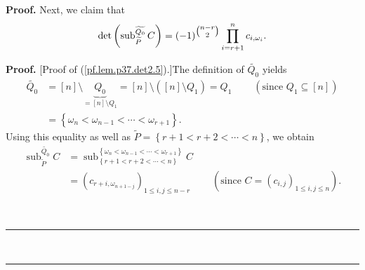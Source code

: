 \documentclass[numbers=enddot,12pt,final,onecolumn,notitlepage]{scrartcl}%
\theoremstyle{definition}
\newenvironment{proof}[1][Proof]{\noindent\textbf{#1.} }{\ \rule{0.5em}{0.5em}}
\let\prodnonlimits\prod
\renewcommand{\prod}{\prodnonlimits\limits}
\begin{document}
\begin{enumerate}
\begin{proof}
Next, we claim that%
\begin{equation}
\det\left(  \operatorname*{sub}\nolimits_{\widetilde{P}}^{\widetilde{Q_{0}}%
}C\right)  =\left(  -1\right)  ^{\tbinom{n-r}{2}}\prod_{i=r+1}^{n}%
c_{i,\omega_{i}}. \label{pf.lem.p37.det2.5}%
\end{equation}


\begin{proof}
[Proof of (\ref{pf.lem.p37.det2.5}).]The definition of $\widetilde{Q_{0}}$
yields%
\begin{align*}
\widetilde{Q_{0}}  &  =\left[  n\right]  \setminus\underbrace{Q_{0}}_{=\left[
n\right]  \setminus Q_{1}}=\left[  n\right]  \setminus\left(  \left[
n\right]  \setminus Q_{1}\right)  =Q_{1}\ \ \ \ \ \ \ \ \ \ \left(
\text{since }Q_{1}\subseteq\left[  n\right]  \right) \\
&  =\left\{  \omega_{n}<\omega_{n-1}<\cdots<\omega_{r+1}\right\}  .
\end{align*}
Using this equality as well as $\widetilde{P}=\left\{  r+1<r+2<\cdots
<n\right\}  $, we obtain%
\begin{align}
\operatorname*{sub}\nolimits_{\widetilde{P}}^{\widetilde{Q_{0}}}C  &
=\operatorname*{sub}\nolimits_{\left\{  r+1<r+2<\cdots<n\right\}  }^{\left\{
\omega_{n}<\omega_{n-1}<\cdots<\omega_{r+1}\right\}  }C\nonumber\\
&  =\left(  c_{r+i,\omega_{n+1-j}}\right)  _{1\leq i,j\leq n-r}%
\ \ \ \ \ \ \ \ \ \ \left(  \text{since }C=\left(  c_{i,j}\right)  _{1\leq
i,j\leq n}\right)  .\nonumber
\end{align}



\end{proof}
\end{proof}
\end{enumerate}
\end{document}
